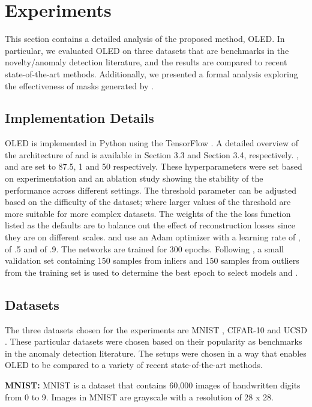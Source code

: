 \documentclass[10pt,twocolumn,letterpaper]{article}
\begin{document}
\section{Experiments}

This section contains a detailed analysis of the proposed method, OLED. In particular, we evaluated OLED on three datasets that are benchmarks in the novelty/anomaly detection literature, and the results are compared to recent state-of-the-art methods. Additionally, we presented a formal analysis exploring the effectiveness of masks generated by . 

\subsection{Implementation Details}
OLED is implemented in Python using the TensorFlow  \cite{tensorflow2015-whitepaper}. A detailed overview of the architecture of  and  is available in Section 3.3 and Section 3.4, respectively. ,  and  are set to 87.5, 1 and 50 respectively. These hyperparameters were set based on experimentation and an ablation study showing the stability of the performance across different settings. The threshold parameter can be adjusted based on the difficulty of the dataset; where larger values of the threshold are more suitable for more complex datasets. The weights of the the loss function listed as the defaults are to balance out the effect of reconstruction losses since they are on different scales.  and  use an Adam optimizer with a learning rate of ,  of .5 and   of .9. The networks are trained for 300 epochs. Following \cite{sabokrou2018adversarially},  a small validation set containing 150 samples from inliers and 150 samples from outliers from the training set is used to determine the best epoch to select models  and .

\subsection{Datasets} 
The three datasets chosen for the experiments are MNIST \cite{lecun1998mnist}, CIFAR-10 \cite{krizhevsky2009learning} and UCSD \cite{chan2008ucsd}. These particular datasets were chosen based on their popularity as benchmarks in the anomaly detection literature. The setups were chosen in a way that enables OLED to be compared to a variety of recent state-of-the-art methods.

{\bf MNIST:} MNIST is a dataset that contains 60,000 images of handwritten digits from 0 to 9. Images in MNIST are grayscale with a resolution of 28 x 28.  
\end{document}
